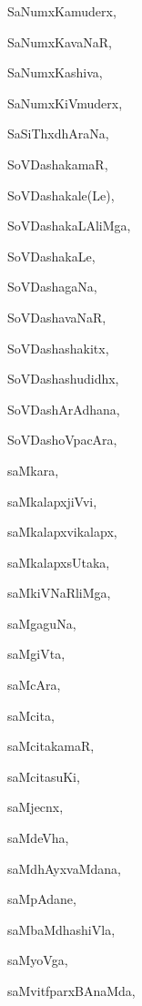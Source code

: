 \begin{multicols}{2}
{SaNumxKamuderx}, \pageref{SaNumxKamuderx}

{SaNumxKavaNaR}, \pageref{SaNumxKavaNaR}

{SaNumxKashiva}, \pageref{SaNumxKashiva}

{SaNumxKiVmuderx}, \pageref{SaNumxKiVmuderx}

{SaSiThxdhAraNa}, \pageref{SaSiThxdhAraNa}

{SoVDashakamaR}, \pageref{SoVDashakamaR}

{SoVDashakale(Le)}, \pageref{SoVDashakaleLe}

{SoVDashakaLAliMga}, \pageref{SoVDashakaLAliMga}

{SoVDashakaLe}, \pageref{SoVDashakaLe}

{SoVDashagaNa}, \pageref{SoVDashagaNa}

{SoVDashavaNaR}, \pageref{SoVDashavaNaR}

{SoVDashashakitx}, \pageref{SoVDashashakitx}

{SoVDashashudidhx}, \pageref{SoVDashashudidhx}

{SoVDashArAdhana}, \pageref{SoVDashArAdhana}

{SoVDashoVpacAra}, \pageref{SoVDashoVpacAra}

{saMkara}, \pageref{saMkara}

{saMkalapxjiVvi}, \pageref{saMkalapxjiVvi}

{saMkalapxvikalapx}, \pageref{saMkalapxvikalapx}

{saMkalapxsUtaka}, \pageref{saMkalapxsUtaka}

{saMkiVNaRliMga}, \pageref{saMkiVNaRliMga}

{saMgaguNa}, \pageref{saMgaguNa}

{saMgiVta}, \pageref{saMgiVta}

{saMcAra}, \pageref{saMcAra}

{saMcita}, \pageref{saMcita}

{saMcitakamaR}, \pageref{saMcitakamaR}

{saMcitasuKi}, \pageref{saMcitasuKi}

{saMjecnx}, \pageref{saMjecnx}

{saMdeVha}, \pageref{saMdeVha}

{saMdhAyxvaMdana}, \pageref{saMdhAyxvaMdana}

{saMpAdane}, \pageref{saMpAdane}

{saMbaMdhashiVla}, \pageref{saMbaMdhashiVla}

{saMyoVga}, \pageref{saMyoVga}

{saMvitfparxBAnaMda}, \pageref{saMvitfparxBAnaMda}


\end{multicols}
